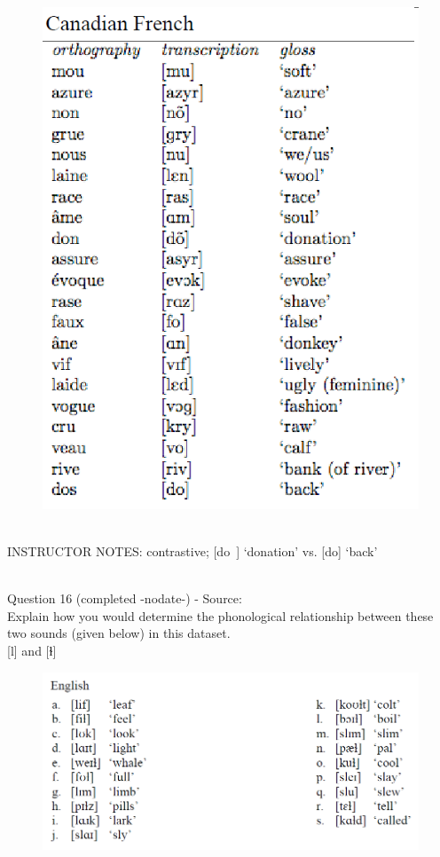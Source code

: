 \documentclass[12pt]{article}
\begin{document}
\begin{figure}[H]
\includegraphics{../images/canadianfrench.png}
\end{figure}

~\\
INSTRUCTOR NOTES: contrastive; [do~] ‘donation’ vs. [do] ‘back’


~\\

{\large Question 16} (completed -nodate-) - Source: \\

Explain how you would determine the phonological relationship between these two sounds (given below) in this dataset.\\

{[l]} and {[ɫ]}

\begin{figure}[H]
\includegraphics{../images/english_laterals.png}
\end{figure}
\end{document}
